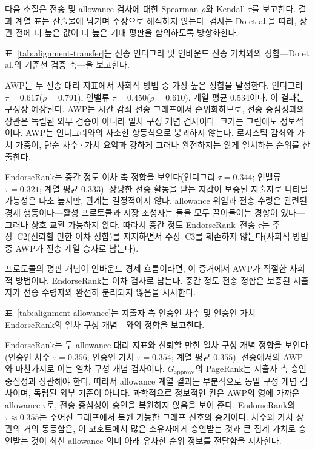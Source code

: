 다음 소절은 전송 및 allowance 검사에 대한 Spearman $\rho$와 Kendall $\tau$를 보고한다. 결과 계열 표는 산출물에 남기며 주장으로 해석하지 않는다. 검사는 Do et al.을 따라, 상관 전에 더 높은 값이 더 높은 기대 평판을 함의하도록 방향화한다.


표~\ref{tab:alignment-transfer}는 전송 인디그리 및 인바운드 전송 가치와의 정합---Do et al.의 기준선 검증 축---을 보고한다.



AWP는 두 전송 대리 지표에서 사회적 방법 중 가장 높은 정합을 달성한다. 인디그리 $\tau=0.617$($\rho=0.791$), 인밸류 $\tau=0.450$($\rho=0.610$), 계열 평균 $0.534$이다. 이 결과는 구성상 예상된다. AWP는 시간 감쇠 전송 그래프에서 순위화하므로, 전송 중심성과의 상관은 독립된 외부 검증이 아니라 일차 구성 개념 검사이다. 크기는 그럼에도 정보적이다. AWP는 인디그리와의 사소한 항등식으로 붕괴하지 않는다. 로지스틱 감쇠와 가치 가중이, 단순 차수·가치 요약과 강하게 그러나 완전하지는 않게 일치하는 순위를 산출한다.

EndorseRank는 중간 정도 이차 축 정합을 보인다(인디그리 $\tau=0.344$; 인밸류 $\tau=0.321$; 계열 평균 $0.333$). 상당한 전송 활동을 받는 지갑이 보증된 지출자로 나타날 가능성은 다소 높지만, 관계는 결정적이지 않다. allowance 위임과 전송 수령은 관련된 경제 행동이다---활성 프로토콜과 시장 조성자는 둘을 모두 끌어들이는 경향이 있다---그러나 상호 교환 가능하지 않다. 따라서 중간 정도 EndorseRank--전송 $\tau$는 주장~C2(신뢰할 만한 이차 정합)를 지지하면서 주장~C3를 훼손하지 않는다(사회적 방법 중 AWP가 전송 계열 승자로 남는다).

프로토콜의 평판 개념이 인바운드 경제 흐름이라면, 이 증거에서 AWP가 적절한 사회적 방법이다. EndorseRank는 이차 검사로 남는다. 중간 정도 전송 정합은 보증된 지출자가 전송 수령자와 완전히 분리되지 않음을 시사한다.


표~\ref{tab:alignment-allowance}는 지출자 측 인승인 차수 및 인승인 가치---EndorseRank의 일차 구성 개념---와의 정합을 보고한다.



EndorseRank는 두 allowance 대리 지표와 신뢰할 만한 일차 구성 개념 정합을 보인다(인승인 차수 $\tau=0.356$; 인승인 가치 $\tau=0.354$; 계열 평균 $0.355$). 전송에서의 AWP와 마찬가지로 이는 일차 구성 개념 검사이다. $G_{\text{approve}}$의 PageRank는 지출자 측 승인 중심성과 상관해야 한다. 따라서 allowance 계열 결과는 부분적으로 동일 구성 개념 검사이며, 독립된 외부 기준이 아니다. 과학적으로 정보적인 칸은 AWP의 영에 가까운 allowance $\tau$로, 전송 중심성이 승인을 복원하지 않음을 보여 준다. EndorseRank의 $\tau \approx 0.355$는 주어진 그래프에서 복원 가능한 그래프 신호의 증거이다. 차수와 가치 상관의 거의 동등함은, 이 코호트에서 많은 소유자에게 승인받는 것과 큰 집계 가치로 승인받는 것이 최신 allowance 의미 아래 유사한 순위 정보를 전달함을 시사한다.

